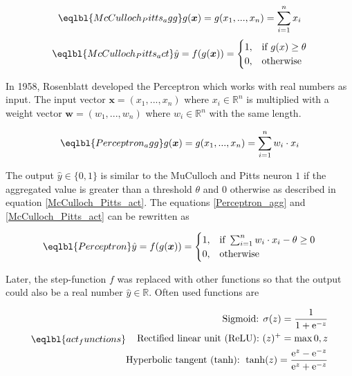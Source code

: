 \begin{equation}\eqlbl{McCulloch_Pitts_agg}
	g(\boldsymbol{x}) = g(x_1, ..., x_n) = \sum_{i=1}^{n}x_i\\
\end{equation}
\begin{equation}\eqlbl{McCulloch_Pitts_act}
		\hat{y} = f(g(\boldsymbol{x})) = \begin{cases}
      		1, & \text{if}\ g(x) \geq \theta \\
      		0, & \text{otherwise}
    	\end{cases}
\end{equation}%

In 1958, Rosenblatt  developed the Perceptron which works with real numbers as input.
The input vector \(\boldsymbol{x} = (x_1, ..., x_n)\) where \(x_i \in \mathbb{R}^n\) is multiplied with a weight vector \(\boldsymbol{w} = (w_1, ..., w_n)\) where \(w_i \in \mathbb{R}^n\) with the same length.

\begin{equation}\eqlbl{Perceptron_agg}
	g(\boldsymbol{x}) = g(x_1, ..., x_n) = \sum_{i=1}^{n} w_i \cdot x_i\\
\end{equation}

The output \(\hat{y} \in \{0, 1\}\) is similar to the MuCulloch and Pitts neuron \(1\) if the aggregated value is greater than a threshold \(\theta\) and \(0\) otherwise as described in equation \ref{McCulloch_Pitts_act}. The equations \eqref*{Perceptron_agg} and \eqref*{McCulloch_Pitts_act} can be rewritten as


\begin{equation}\eqlbl{Perceptron}
		\hat{y} =f(g(\boldsymbol{x})) = \begin{cases}
      		1, & \text{if}\ \sum_{i=1}^{n}w_i \cdot x_i - \theta \geq 0 \\
      		0, & \text{otherwise}
    	\end{cases}
\end{equation}

Later, the step-function \(f\) was replaced with other functions so that the output could also be a real number \(\hat{y} \in \mathbb{R}\). Often used functions are

\begin{equation}\eqlbl{act_functions}
	\begin{aligned}
		\text{Sigmoid: } \sigma(z) = \frac{1}{1+\mathrm{e}^{-z}}\\
		\text{Rectified linear unit (ReLU): } (z)^{+} = \max{0, z}\\
		\text{Hyperbolic tangent (tanh): } \tanh(z) = \frac{\mathrm{e}^{z}-\mathrm{e}^{-z}}{\mathrm{e}^{z}+\mathrm{e}^{-z}}
	\end{aligned}
\end{equation}

